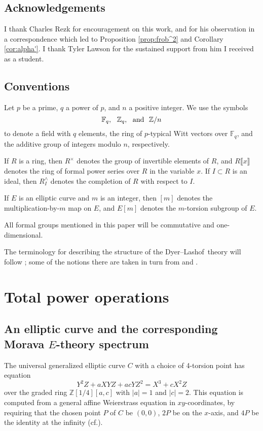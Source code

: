 \documentclass{gtpart}
\theoremstyle{definition}
\theoremstyle{remark}
\newcommand{\mb}[1]{\mathbb{#1}}
\newcommand{\cf}{cf.\thinspace}
\newcommand{\DL}{Dyer--Lashof~}
\newcommand{\BF}{{\mb F}}
\newcommand{\BZ}{{\mb Z}}
\newcommand{\ad}{{\rm and}}
\begin{document}
\subsection{Acknowledgements}

I thank Charles Rezk for encouragement on this work, and for his observation in a correspondence which led to Proposition \ref{prop:frob^2} and Corollary \ref{cor:alpha'}.  
I thank Tyler Lawson for the sustained support from him I received as a student.  


\subsection{Conventions}

Let $p$ be a prime, $q$ a power of $p$, and $n$ a positive integer.  We use the symbols 
\[
 \BF_q,~~\BZ_q,~~\ad~~\BZ/n 
\]
to denote a field with $q$ elements, the ring of $p$-typical Witt vectors over $\BF_q$, 
and the additive group of integers modulo $n$, respectively.  

If $R$ is a ring, then $R^\times$ denotes the group of invertible elements of $R$, 
and $R\llbracket x \rrbracket$ denotes the ring of formal power series over $R$ in the variable $x$.  
If $I \subset R$ is an ideal, then $R_I^\wedge$ denotes the completion of $R$ with respect to $I$.  

If $E$ is an elliptic curve and $m$ is an integer, then $[m]$ denotes the multiplication-by-$m$ map on $E$, and $E[m]$ denotes the $m$-torsion subgroup of $E$.  

All formal groups mentioned in this paper will be commutative and one-dimensional.  

The terminology for describing the structure of the \DL theory will follow \cite{cong, h2p2}; 
some of the notions there are taken in turn from \cite{BW} and \cite{V}.  


\section{Total power operations}
\label{sec:total}

\subsection{An elliptic curve and the corresponding Morava $E$-theory spectrum}

The universal generalized elliptic curve $C$ with a choice of 4-torsion point has equation 
\[
 Y^2 Z + a X Y Z + a c Y Z^2 = X^3 + c X^2 Z 
\]
over the graded ring $\BZ [1/4] [a,c]$ with $|a| = 1$ and $|c| = 2$.  
This equation is computed from a general affine Weierstrass equation in $xy$-coordinates, 
by requiring that the chosen point $P$ of $C$ be $(0,0)$, $2P$ be on the $x$-axis, and $4P$ be the identity at the infinity (\cf \cite[4(4.6a)]{ec}).  
\end{document}
